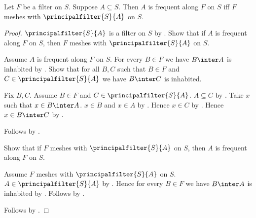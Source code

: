 \begin{theorem}\label{filter_frequent_iff_meshes_principal}
    Let $F$ be a filter on $S$.
    Suppose $A\subseteq S$.
    Then $A$ is frequent along $F$ on $S$ iff
        $F$ meshes with $\principalfilter{S}{A}$ on $S$.
\end{theorem}
\begin{proof}
    $\principalfilter{S}{A}$ is a filter on $S$ by
        .
    Show that if $A$ is frequent along $F$ on $S$, then
        $F$ meshes with $\principalfilter{S}{A}$ on $S$.
    \begin{subproof}
        Assume $A$ is frequent along $F$ on $S$.
        For every $B\in F$ we have $B\inter A$ is inhabited by
            .
        Show that for all $B,C$ such that $B\in F$ and
            $C\in\principalfilter{S}{A}$ we have $B\inter C$ is inhabited.
        \begin{subproof}
            Fix $B,C$.
            Assume $B\in F$ and $C\in\principalfilter{S}{A}$.
            $A\subseteq C$ by .
            Take $x$ such that $x\in B\inter A$.
            $x\in B$ and $x\in A$ by .
            Hence $x\in C$ by .
            Hence $x\in B\inter C$ by .
        \end{subproof}
        Follows by .
    \end{subproof}

    Show that if $F$ meshes with $\principalfilter{S}{A}$ on $S$, then
        $A$ is frequent along $F$ on $S$.
    \begin{subproof}
        Assume $F$ meshes with $\principalfilter{S}{A}$ on $S$.
        $A\in\principalfilter{S}{A}$ by .
        Hence for every $B\in F$ we have $B\inter A$ is inhabited by
            .
        Follows by .
    \end{subproof}
    Follows by \auto.
\end{proof}
